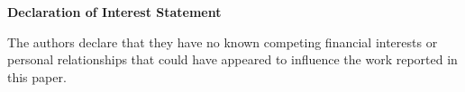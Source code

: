 \documentclass[12pt]{article}
\begin{document}
\noindent\textbf{Declaration of Interest Statement}

\bigskip

\noindent The authors declare that they have no known competing financial interests or personal relationships that could have appeared to influence the work reported in this paper.
\end{document}
